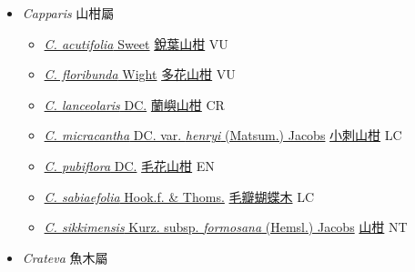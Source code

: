 
  \begin{itemize}
 \item[] \textit{Capparis} 山柑屬
                    
  \begin{itemize}
        \item[] \href{http://www.theplantlist.org/tpl1.1/search?q=Capparis+acutifolia}{\textit{C. acutifolia} Sweet}   \href{\detokenize{http://taibnet.sinica.edu.tw/chi/taibnet_species_list.php?T2=銳葉山柑&T2_new_value=true&fr=y}}{銳葉山柑} VU
        \item[] \href{http://www.theplantlist.org/tpl1.1/search?q=Capparis+floribunda}{\textit{C. floribunda} Wight}   \href{\detokenize{http://taibnet.sinica.edu.tw/chi/taibnet_species_list.php?T2=多花山柑&T2_new_value=true&fr=y}}{多花山柑} VU
        \item[] \href{http://www.theplantlist.org/tpl1.1/search?q=Capparis+lanceolaris}{\textit{C. lanceolaris} DC.}   \href{\detokenize{http://taibnet.sinica.edu.tw/chi/taibnet_species_list.php?T2=蘭嶼山柑&T2_new_value=true&fr=y}}{蘭嶼山柑} CR
        \item[] \href{http://www.theplantlist.org/tpl1.1/search?q=Capparis+micracantha+var.+henryi}{\textit{C. micracantha} DC. var. \textit{henryi} (Matsum.) Jacobs}   \href{\detokenize{http://taibnet.sinica.edu.tw/chi/taibnet_species_list.php?T2=小刺山柑&T2_new_value=true&fr=y}}{小刺山柑} LC
        \item[] \href{http://www.theplantlist.org/tpl1.1/search?q=Capparis+pubiflora}{\textit{C. pubiflora} DC.}   \href{\detokenize{http://taibnet.sinica.edu.tw/chi/taibnet_species_list.php?T2=毛花山柑&T2_new_value=true&fr=y}}{毛花山柑} EN
        \item[] \href{http://www.theplantlist.org/tpl1.1/search?q=Capparis+sabiaefolia}{\textit{C. sabiaefolia} Hook.f. \& Thoms.}   \href{\detokenize{http://taibnet.sinica.edu.tw/chi/taibnet_species_list.php?T2=毛瓣蝴蝶木&T2_new_value=true&fr=y}}{毛瓣蝴蝶木} LC
        \item[] \href{http://www.theplantlist.org/tpl1.1/search?q=Capparis+sikkimensis+subsp.+formosana}{\textit{C. sikkimensis} Kurz. subsp. \textit{formosana} (Hemsl.) Jacobs}   \href{\detokenize{http://taibnet.sinica.edu.tw/chi/taibnet_species_list.php?T2=山柑&T2_new_value=true&fr=y}}{山柑} NT
  \end{itemize}
 \item[] \textit{Crateva} 魚木屬
                    

\end{itemize}

